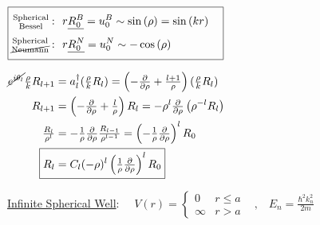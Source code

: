 \documentclass[12pt]{article}
\begin{document}
\hfill
\vline
\hfill
\begin{minipage}[t]{.48\textwidth}
    \(
        \boxed{
        \begin{aligned}[t]
            \begin{gathered}
                \text{\scriptsize Spherical} \\[-7pt]
                \text{\scriptsize Bessel}
            \end{gathered}: & \ \ r \underline{R_0^B} = u_0^B \sim \sin{(\rho)} = \sin{(kr)}
                \\[-3pt]
            \begin{gathered}
                \text{\scriptsize Spherical} \\[-7pt]
                \cancel{ \text{\scriptsize Neumann} }
            \end{gathered}: & \ \ r \underline{R_0^N} = u_0^N \sim - \cos{(\rho)}
        \end{aligned}
        }
    \)
    
    \vspace{10pt}
    \(
        \begin{aligned}
            \cancel{ e^{i\theta_l} } \tfrac{\rho}{k} R_{l+1} & = a_{l}^\dagger (\tfrac{\rho}{k} R_l) 
                = \left( - \tfrac{\partial}{\partial \rho} + \tfrac{l+1}{\rho} \right) (\tfrac{\rho}{k} R_l) 
                \\
            R_{l+1} & = \left( - \tfrac{\partial}{\partial \rho} + \tfrac{l}{\rho} \right) R_l 
                = - \rho^l \tfrac{\partial}{\partial \rho} \left( \rho^{-l} R_l \right)
                \\
                \tfrac{ R_{l} }{\rho^{l}} & = - \tfrac{1}{\rho} \tfrac{\partial}{\partial \rho} \tfrac{R_{l-1}}{\rho^{l-1}}
                    = \left( - \tfrac{1}{\rho} \tfrac{\partial}{\partial \rho} \right)^l R_0
                    \\
                \Aboxed{ R_l & = C_l (- \rho)^l \left( \tfrac{1}{\rho} \tfrac{\partial}{\partial \rho} \right)^l R_0 }
        \end{aligned}
    \)  
\end{minipage}

\vspace{15pt}\noindent
\underline{Infinite Spherical Well}: \ \ \(
    V(r) = \begin{cases}
        0 & r \leq a\\
        \infty & r > a
    \end{cases}
    \hspace{10pt} , \hspace{10pt}
    E_n = \tfrac{\hbar^2 k_n^2}{2m}
\)
\end{document}
